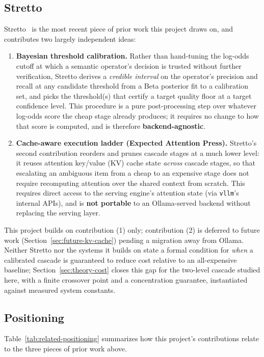 \subsection{Stretto}
Stretto~\cite{stretto} is the most recent piece of prior work this
project draws on, and contributes two largely independent ideas:
\begin{enumerate}
  \item \textbf{Bayesian threshold calibration.} Rather than hand-tuning
        the log-odds cutoff at which a semantic operator's decision is
        trusted without further verification, Stretto derives a
        \emph{credible interval} on the operator's precision and recall
        at any candidate threshold from a Beta posterior fit to a
        calibration set, and picks the threshold(s) that certify a
        target quality floor at a target confidence level. This
        procedure is a pure post-processing step over whatever log-odds
        score the cheap stage already produces; it requires no change
        to how that score is computed, and is therefore
        \textbf{backend-agnostic}.
  \item \textbf{Cache-aware execution ladder (Expected Attention Press).}
        Stretto's second contribution reorders and prunes cascade
        stages at a much lower level: it reuses attention key/value
        (KV) cache state \emph{across} cascade stages, so that escalating
        an ambiguous item from a cheap to an expensive stage does not
        require recomputing attention over the shared context from
        scratch. This requires direct access to the serving engine's
        attention state (\eg via \texttt{vllm}'s internal APIs), and is
        \textbf{not portable} to an Ollama-served backend without
        replacing the serving layer.
\end{enumerate}
This project builds on contribution (1) only; contribution (2) is
deferred to future work (Section~\ref{sec:future-kv-cache}) pending a
migration away from Ollama. Neither Stretto nor the systems it builds on
state a formal condition for \emph{when} a calibrated cascade is
guaranteed to reduce cost relative to an all-expensive baseline;
Section~\ref{sec:theory-cost} closes this gap for the two-level cascade
studied here, with a finite crossover point and a concentration
guarantee, instantiated against measured system constants.

\subsection{Positioning}
Table~\ref{tab:related-positioning} summarizes how this project's
contributions relate to the three pieces of prior work above.

